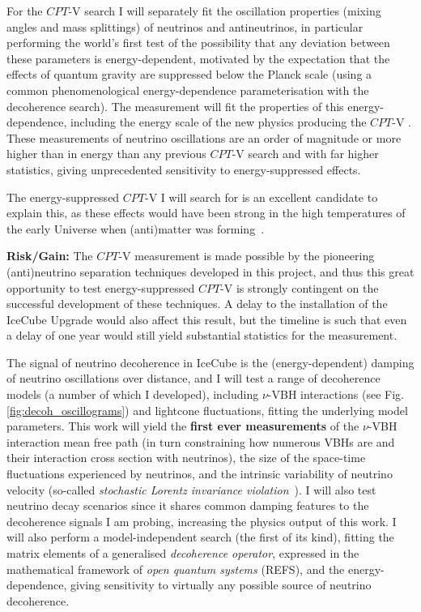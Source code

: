 \documentclass[a4paper,11pt]{article}
\begin{document}
For the $CPT$-V search I will separately fit the oscillation properties (mixing angles and mass splittings) of neutrinos and antineutrinos, in particular performing the world's first test of the possibility that any deviation between these parameters is energy-dependent, motivated by the expectation that the effects of quantum gravity are suppressed below the Planck scale (using a common phenomenological energy-dependence parameterisation with the decoherence search). The measurement will fit the properties of this energy-dependence, including the energy scale of the new physics producing the $CPT$-V . These measurements of neutrino oscillations are an order of magnitude or more higher than in energy than any previous $CPT$-V search and with far higher statistics, giving unprecedented sensitivity to energy-suppressed effects.

 The energy-suppressed $CPT$-V I will search for is an excellent candidate to explain this, as these effects would have been strong in the high temperatures of the early Universe when (anti)matter was forming~\cite{Mavromatos:2017cxr, hep-ph/9809542, Ellis:2013gca}.


\textbf{Risk/Gain:} The $CPT$-V measurement is made possible by the pioneering (anti)neutrino separation techniques developed in this project, and thus this great opportunity to test energy-suppressed $CPT$-V is strongly contingent on the successful development of these techniques. A delay to the installation of the IceCube Upgrade would also affect this result, but the timeline is such that even a delay of one year would still yield substantial statistics for the measurement.

The signal of neutrino decoherence in IceCube is the (energy-dependent) damping of neutrino oscillations over distance, and I will test a range of decoherence models (a number of which I developed), including $\nu$-VBH interactions (see Fig. \ref{fig:decoh_oscillograms}) and lightcone fluctuations, fitting the underlying model parameters. This work will yield the \textbf{first ever measurements} of the $\nu$-VBH interaction mean free path (in turn constraining how numerous VBHs are and their interaction cross section with neutrinos), the size of the space-time fluctuations experienced by neutrinos, and the intrinsic variability of neutrino velocity (so-called \textit{stochastic Lorentz invariance violation}~\cite{Vasileiou2015, Amelino-Camelia:2016fuh}). I will also test neutrino decay scenarios since it shares common damping features to the decoherence signals I am probing, increasing the physics output of this work. I will also perform a model-independent search (the first of its kind), fitting the matrix elements of a generalised \textit{decoherence operator}, expressed in the mathematical framework of \textit{open quantum systems} (REFS), and the energy-dependence, giving sensitivity to virtually any possible source of neutrino decoherence. 
\end{document}
